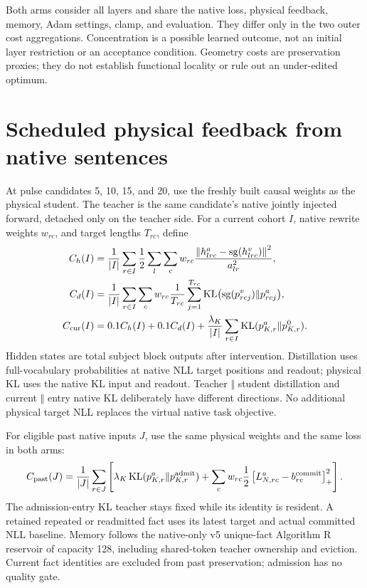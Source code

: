 \documentclass[10pt]{article}
\newcommand{\KL}{\operatorname{KL}}
\newcommand{\sg}{\operatorname{sg}}
\newcommand{\norm}[1]{\left\lVert#1\right\rVert}
\newcommand{\pos}[1]{\left[#1\right]_+}
\begin{document}
Both arms consider all layers and share the native loss, physical
feedback, memory, Adam settings, clamp, and evaluation. They differ only
in the two outer cost aggregations. Concentration is a possible learned
outcome, not an initial layer restriction or an acceptance condition.
Geometry costs are preservation proxies; they do not establish functional
locality or rule out an under-edited optimum.

\newpage
\section{Scheduled physical feedback from native sentences}
At pulse candidates 5, 10, 15, and 20, use the freshly built causal
weights as the physical student. The teacher is the same candidate's
native jointly injected forward, detached only on the teacher side.
For a current cohort $I$, native rewrite weights $w_{rc}$, and target
lengths $T_{rc}$, define
\begin{align}
 C_h(I)&=\frac1{|I|}\sum_{r\in I}\frac12\sum_l\sum_cw_{rc}
  \frac{\norm{h^a_{lrc}-\sg(h^v_{lrc})}^2}{a_{lr}^2},\\
 C_d(I)&=\frac1{|I|}\sum_{r\in I}\sum_cw_{rc}\frac1{T_{rc}}
  \sum_{j=1}^{T_{rc}}\KL\bigl(\sg(p^v_{rcj})\Vert p^a_{rcj}\bigr),\\
 C_{\rm cur}(I)&=0.1C_h(I)+0.1C_d(I)
  +\frac{\lambda_K}{|I|}\sum_{r\in I}\KL(p^a_{K,r}\Vert p^0_{K,r}).
\end{align}
Hidden states are total subject block outputs after intervention.
Distillation uses full-vocabulary probabilities at native NLL target
positions and readout; physical KL uses the native KL input and readout.
Teacher $\Vert$ student distillation and current $\Vert$ entry native
KL deliberately have different directions. No additional physical target
NLL replaces the virtual native task objective.

For eligible past native inputs $J$, use the same physical weights and
the same loss in both arms:
\[
 C_{\rm past}(J)=\frac1{|J|}\sum_{r\in J}\left[
  \lambda_K\KL(p^a_{K,r}\Vert p^{\rm admit}_{K,r})
  +\sum_cw_{rc}\frac12\pos{L^a_{N,rc}-b^{\rm commit}_{rc}}^2\right].
\]
The admission-entry KL teacher stays fixed while its identity is
resident. A retained repeated or readmitted fact uses its latest target
and actual committed NLL baseline. Memory follows the native-only v5
unique-fact Algorithm R reservoir of capacity 128, including shared-token
teacher ownership and eviction. Current fact identities are excluded
from past preservation; admission has no quality gate.
\end{document}
